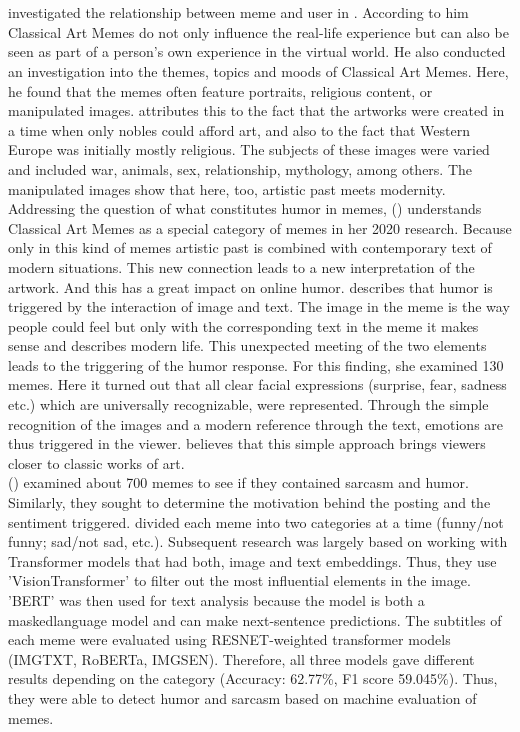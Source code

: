 \documentclass[11pt,a4paper]{article}
\begin{document}
\\
\\ \citeauthor{Raivio2016} investigated the relationship between meme and user in \citeyear{Raivio2016}. According to him Classical Art Memes do not only influence the real-life experience but can also be seen as part of a person's own experience in the virtual world. He also conducted an investigation into the themes, topics and moods of Classical Art Memes. Here, he found that the memes often feature portraits, religious content, or manipulated images. \citeauthor{Raivio2016} attributes this to the fact that the artworks were created in a time when only nobles could afford art, and also to the fact that Western Europe was initially mostly religious. The subjects of these images were varied and included war, animals, sex, relationship, mythology, among others. The manipulated images show that here,
too, artistic past meets modernity.
\\Addressing the question of what constitutes humor in memes, \citeauthor{Piata2019} (\citeyear{Piata2019}) understands Classical Art Memes as a special category of memes in her 2020 research. Because only in this kind of memes artistic past is combined with contemporary text of modern situations. This new connection leads to a new interpretation of the artwork. And this has a great impact on online humor. \citeauthor{Piata2019} describes that humor is triggered by the interaction of image and text. The image in the meme is the way people could feel but only with the corresponding text in the meme it makes sense and describes modern life. This unexpected meeting of the two elements leads to the triggering of the humor response. For this finding, she examined 130 memes. Here it turned out that all clear facial expressions (surprise, fear, sadness etc.) which are universally recognizable, were represented. Through the simple recognition of the images and a modern reference through the text, emotions are thus triggered in the viewer. \citeauthor{Piata2019} believes that this simple approach brings viewers closer to classic works of art.
\\ \citeauthor{alluri2021} (\citeyear{alluri2021}) examined about 700
memes to see if they contained sarcasm and humor. Similarly, they sought to determine the motivation behind the posting and the sentiment triggered. \citeauthor{alluri2021} divided each meme into two categories at a time (funny/not funny; sad/not sad, etc.). Subsequent research was largely based on working with Transformer models that had both, image and text embeddings. Thus, they use 'VisionTransformer' to filter out the most influential elements in the image. 'BERT' was then used for text analysis because the model is both a maskedlanguage model and can make next-sentence predictions. The subtitles of each meme were evaluated using RESNET-weighted transformer models (IMGTXT, RoBERTa, IMGSEN). Therefore, all three models gave different results depending on the category (Accuracy: 62.77\%, F1 score 59.045\%). Thus, they were able to detect humor and sarcasm based on machine evaluation of memes.
\end{document}
